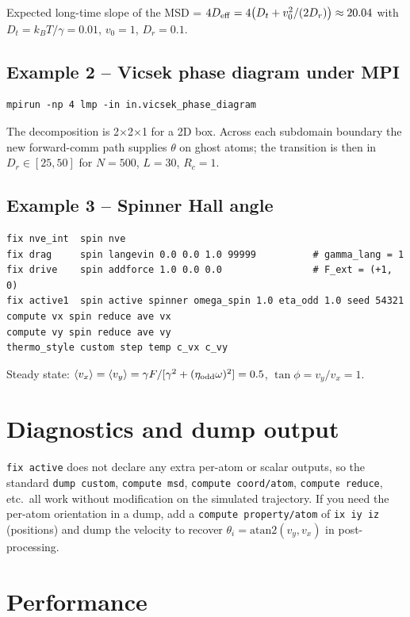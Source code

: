 \documentclass[11pt,a4paper]{article}
\begin{document}
\noindent
Expected long-time slope of the MSD = $4 D_{\rm eff}=4\bigl(D_t+v_0^2/(2D_r)\bigr)\approx 20.04$
with $D_t=k_BT/\gamma=0.01$, $v_0=1$, $D_r=0.1$.

\subsection{Example 2 -- Vicsek phase diagram under MPI}

\begin{lstlisting}
mpirun -np 4 lmp -in in.vicsek_phase_diagram
\end{lstlisting}
The decomposition is 2$\times$2$\times$1 for a 2D box.  Across each subdomain
boundary the new forward-comm path supplies $\theta$ on ghost atoms; the
transition is then in $D_r\in[25,50]$ for $N=500$, $L=30$, $R_c=1$.

\subsection{Example 3 -- Spinner Hall angle}

\begin{lstlisting}
fix nve_int  spin nve
fix drag     spin langevin 0.0 0.0 1.0 99999          # gamma_lang = 1
fix drive    spin addforce 1.0 0.0 0.0                # F_ext = (+1, 0)
fix active1  spin active spinner omega_spin 1.0 eta_odd 1.0 seed 54321
compute vx spin reduce ave vx
compute vy spin reduce ave vy
thermo_style custom step temp c_vx c_vy
\end{lstlisting}
Steady state: $\langle v_x\rangle=\langle v_y\rangle=\gamma F/[\gamma^2+(\eta_{\rm odd}\omega)^2]=0.5$,
$\tan\phi = v_y/v_x = 1$.

\section{Diagnostics and dump output}

\texttt{fix active} does not declare any extra per-atom or scalar outputs,
so the standard \texttt{dump custom}, \texttt{compute msd},
\texttt{compute coord/atom}, \texttt{compute reduce}, etc.\ all work
without modification on the simulated trajectory.  If you need the
per-atom orientation in a dump, add a \texttt{compute property/atom}
of \texttt{ix iy iz} (positions) and dump the velocity to recover
$\theta_i = \mathrm{atan2}(v_y, v_x)$ in post-processing.

\section{Performance}
\end{document}
